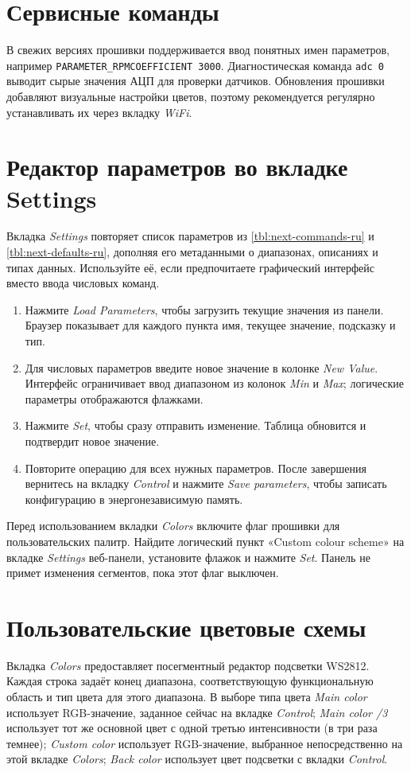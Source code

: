 \section{Сервисные команды}
В свежих версиях прошивки поддерживается ввод понятных имен параметров, например \verb|PARAMETER_RPMCOEFFICIENT 3000|.
Диагностическая команда \verb|adc 0| выводит сырые значения АЦП для проверки датчиков.
Обновления прошивки добавляют визуальные настройки цветов, поэтому рекомендуется регулярно устанавливать их через вкладку \emph{WiFi}.

\section{Редактор параметров во вкладке Settings}
Вкладка \emph{Settings} повторяет список параметров из \autoref{tbl:next-commands-ru} и \autoref{tbl:next-defaults-ru}, дополняя его метаданными о диапазонах, описаниях и типах данных.
Используйте её, если предпочитаете графический интерфейс вместо ввода числовых команд.


\begin{enumerate}
    \item Нажмите \emph{Load Parameters}, чтобы загрузить текущие значения из панели. Браузер показывает для каждого пункта имя, текущее значение, подсказку и тип.
    \item Для числовых параметров введите новое значение в колонке \emph{New Value}. Интерфейс ограничивает ввод диапазоном из колонок \emph{Min} и \emph{Max}; логические параметры отображаются флажками.
    \item Нажмите \emph{Set}, чтобы сразу отправить изменение. Таблица обновится и подтвердит новое значение.
    \item Повторите операцию для всех нужных параметров. После завершения вернитесь на вкладку \emph{Control} и нажмите \emph{Save parameters}, чтобы записать конфигурацию в энергонезависимую память.
\end{enumerate}

Перед использованием вкладки \emph{Colors} включите флаг прошивки для пользовательских палитр. Найдите логический пункт «Custom colour scheme» на вкладке \emph{Settings} веб-панели, установите флажок и нажмите \emph{Set}. Панель не примет изменения сегментов, пока этот флаг выключен.

\section{Пользовательские цветовые схемы}
Вкладка \emph{Colors} предоставляет посегментный редактор подсветки WS2812. Каждая строка задаёт конец диапазона, соответствующую функциональную область и тип цвета для этого диапазона. В выборе типа цвета \emph{Main color} использует RGB-значение, заданное сейчас на вкладке \emph{Control}; \emph{Main color /3} использует тот же основной цвет с одной третью интенсивности (в три раза темнее); \emph{Custom color} использует RGB-значение, выбранное непосредственно на этой вкладке \emph{Colors}; \emph{Back color} использует цвет подсветки с вкладки \emph{Control}.

